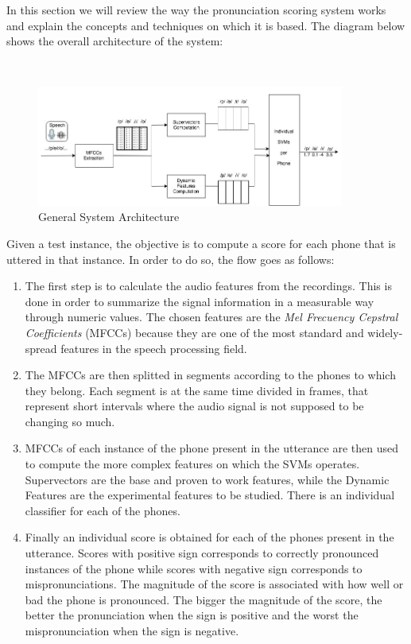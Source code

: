 In this section we will review the way the pronunciation scoring system works
and explain the concepts and techniques on which it is based. The diagram below
shows the overall architecture of the system:

~

\begin{figure}[H]
	\centering
	\includegraphics[width=0.9\textwidth]{files/figures/method/general-structure-v2.jpg}
	\caption{General System Architecture}
	\label{fig:methodGeneralArchitecture}
\end{figure}

Given a test instance, the objective is to compute a score for each phone that
is uttered in that instance. In order to do so, the flow goes as follows:

\begin{enumerate}

 \item The first step is to calculate the audio features from the recordings.
 This is done in order to summarize the signal information
 in a measurable way through numeric values. The chosen features
 are the \textit{Mel Frecuency Cepstral Coefficients} (MFCCs) because they are one of the
 most standard and widely-spread features in the speech processing field.

 \item The MFCCs are then splitted in segments according to the phones to which they
 belong. Each segment is at the same time divided in frames, that represent short
 intervals where the audio signal is not supposed to be changing so much.

 \item MFCCs of each instance of the phone present in the utterance
 are then used to compute the more complex features
 on which the SVMs operates. Supervectors are the base and proven to work features,
 while the Dynamic Features are the experimental features to be studied.
 There is an individual classifier for each of the phones.

 \item Finally an individual score is obtained for each of the phones present in the
 utterance. Scores with positive sign corresponds to correctly pronounced instances of the phone
 while scores with negative sign corresponds to mispronunciations. The magnitude of the score
 is associated with how well or bad the phone is pronounced.
 The bigger the magnitude of the score, the better the pronunciation when the sign is positive
 and the worst the mispronunciation when the sign is negative.

\end{enumerate}


